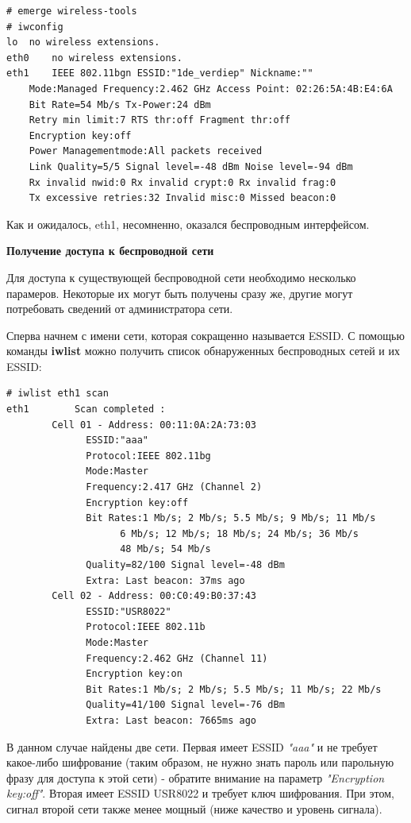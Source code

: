 \documentclass[10pt]{book}
\begin{document}
\begin{tcolorbox}
\begin{lstlisting}
# emerge wireless-tools
# iwconfig
lo	no wireless extensions.
eth0	no wireless extensions.
eth1	IEEE 802.11bgn ESSID:"1de_verdiep" Nickname:""
	Mode:Managed Frequency:2.462 GHz Access Point: 02:26:5A:4B:E4:6A
	Bit Rate=54 Mb/s Tx-Power:24 dBm
	Retry min limit:7 RTS thr:off Fragment thr:off
	Encryption key:off
	Power Managementmode:All packets received
	Link Quality=5/5 Signal level=-48 dBm Noise level=-94 dBm
	Rx invalid nwid:0 Rx invalid crypt:0 Rx invalid frag:0
	Tx excessive retries:32 Invalid misc:0 Missed beacon:0
\end{lstlisting}
\end{tcolorbox}

Как и ожидалось, eth1, несомненно, оказался беспроводным интерфейсом.

\textbf{Получение доступа к беспроводной сети}

Для доступа к существующей беспроводной сети необходимо несколько парамеров. Некоторые их могут быть получены сразу же, другие могут потребовать сведений от администратора сети.

Сперва начнем с имени сети, которая сокращенно называется ESSID. С помощью команды  \textbf{iwlist} можно получить список обнаруженных беспроводных сетей и их ESSID:

\begin{tcolorbox}
\begin{lstlisting}
# iwlist eth1 scan
eth1		Scan completed :
		Cell 01 - Address: 00:11:0A:2A:73:03
			  ESSID:"aaa"
			  Protocol:IEEE 802.11bg
			  Mode:Master
			  Frequency:2.417 GHz (Channel 2)
			  Encryption key:off
			  Bit Rates:1 Mb/s; 2 Mb/s; 5.5 Mb/s; 9 Mb/s; 11 Mb/s
				    6 Mb/s; 12 Mb/s; 18 Mb/s; 24 Mb/s; 36 Mb/s
				    48 Mb/s; 54 Mb/s
			  Quality=82/100 Signal level=-48 dBm
			  Extra: Last beacon: 37ms ago
		Cell 02 - Address: 00:C0:49:B0:37:43
			  ESSID:"USR8022"
			  Protocol:IEEE 802.11b
			  Mode:Master
			  Frequency:2.462 GHz (Channel 11)
			  Encryption key:on
			  Bit Rates:1 Mb/s; 2 Mb/s; 5.5 Mb/s; 11 Mb/s; 22 Mb/s
			  Quality=41/100 Signal level=-76 dBm
			  Extra: Last beacon: 7665ms ago
\end{lstlisting}
\end{tcolorbox}

В данном случае найдены две сети. Первая имеет ESSID \textit{"aaa"} и не требует какое-либо шифрование (таким образом, не нужно знать пароль или парольную фразу для доступа к этой сети) - обратите внимание на параметр \textit{"Encryption key:off"}. Вторая имеет ESSID USR8022 и требует ключ шифрования. При этом, сигнал второй сети также менее мощный (ниже качество и уровень сигнала).
\end{document}
